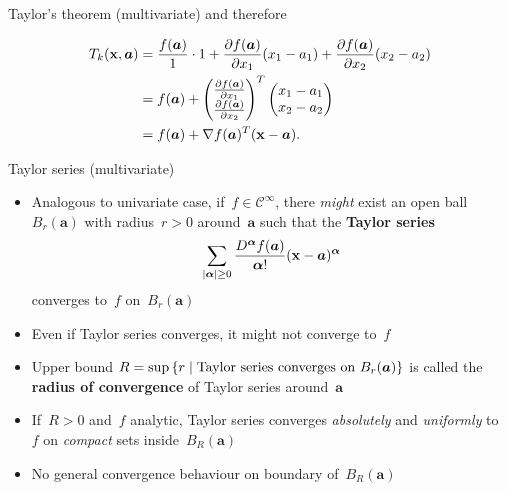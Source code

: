 \documentclass[11pt,compress,t,notes=noshow, xcolor=table]{beamer}
\begin{document}
\begin{vbframe}{Taylor's theorem (multivariate)}
and therefore

\vspace{-\baselineskip}

\begin{align*}
    T_k(\mathbf{x},\bm{a}) &= \frac{f(\bm{a})}{1} \cdot 1 + \frac{\partial f(\bm{a})}{\partial x_1} (x_1 - a_1) + \frac{\partial f(\bm{a})}{\partial x_2} (x_2 - a_2) \\
    &= f(\bm{a}) + \begin{pmatrix}\frac{\partial f(\bm{a})}{\partial x_1} \\ \frac{\partial f(\bm{a})}{\partial x_2}\end{pmatrix}^T \begin{pmatrix}x_1 - a_1 \\ x_2 - a_2\end{pmatrix} \\
    &= f(\bm{a}) + \nabla f(\bm{a})^T (\mathbf{x} - \bm{a}). 
\end{align*}

\end{vbframe}

\begin{vbframe}{Taylor series (multivariate)}

\begin{itemize}
    \item Analogous to univariate case, if~$f \in \mathcal{C}^\infty$, there \textit{might} exist an open ball~$B_r(\bm{a})$ with radius~$r>0$ around~$\bm{a}$ such that the \textbf{Taylor series}
        \begin{equation*}
            \sum_{|\bm{\alpha}| \geq 0} \frac{D^{\bm{\alpha}} f(\bm{a})}{{\bm{\alpha}}!} (\mathbf{x} - \bm{a})^{\bm{\alpha}}
        \end{equation*}
        converges to~$f$ on~$B_r(\bm{a})$
    \item Even if Taylor series converges, it might not converge to~$f$
    \item Upper bound $R = \sup \left\lbrace r \;|\; \textnormal{Taylor series converges on } B_r(\bm{a}) \right\rbrace$ is called the \textbf{radius of convergence} of Taylor series around~$\bm{a}$
    \item If~$R>0$ and~$f$ analytic, Taylor series converges \textit{absolutely} and \textit{uniformly} to~$f$ on \textit{compact} sets inside~$B_R(\bm{a})$
    \item No general convergence behaviour on boundary of~$B_R(\bm{a})$
\end{itemize}

\end{vbframe}

\endlecture
\end{document}
